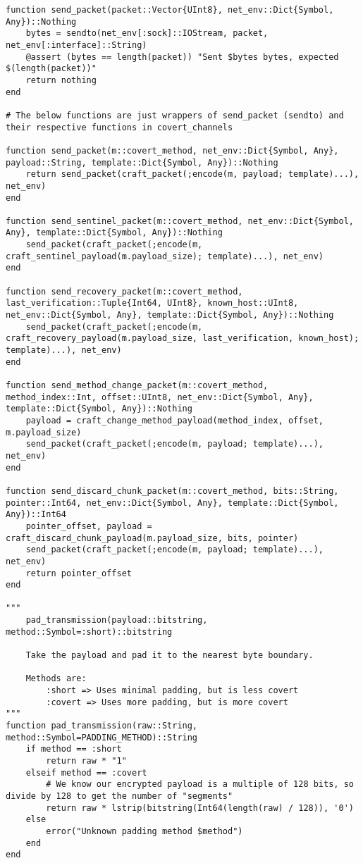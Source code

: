 \begin{lstlisting}[language=JuliaLocal, style=julia]
function send_packet(packet::Vector{UInt8}, net_env::Dict{Symbol, Any})::Nothing
    bytes = sendto(net_env[:sock]::IOStream, packet, net_env[:interface]::String)
    @assert (bytes == length(packet)) "Sent $bytes bytes, expected $(length(packet))"
    return nothing
end

# The below functions are just wrappers of send_packet (sendto) and their respective functions in covert_channels

function send_packet(m::covert_method, net_env::Dict{Symbol, Any}, payload::String, template::Dict{Symbol, Any})::Nothing
    return send_packet(craft_packet(;encode(m, payload; template)...), net_env)
end

function send_sentinel_packet(m::covert_method, net_env::Dict{Symbol, Any}, template::Dict{Symbol, Any})::Nothing
    send_packet(craft_packet(;encode(m, craft_sentinel_payload(m.payload_size); template)...), net_env)
end

function send_recovery_packet(m::covert_method, last_verification::Tuple{Int64, UInt8}, known_host::UInt8, net_env::Dict{Symbol, Any}, template::Dict{Symbol, Any})::Nothing
    send_packet(craft_packet(;encode(m, craft_recovery_payload(m.payload_size, last_verification, known_host); template)...), net_env)
end

function send_method_change_packet(m::covert_method, method_index::Int, offset::UInt8, net_env::Dict{Symbol, Any}, template::Dict{Symbol, Any})::Nothing
    payload = craft_change_method_payload(method_index, offset, m.payload_size)
    send_packet(craft_packet(;encode(m, payload; template)...), net_env)
end

function send_discard_chunk_packet(m::covert_method, bits::String, pointer::Int64, net_env::Dict{Symbol, Any}, template::Dict{Symbol, Any})::Int64
    pointer_offset, payload = craft_discard_chunk_payload(m.payload_size, bits, pointer)
    send_packet(craft_packet(;encode(m, payload; template)...), net_env)
    return pointer_offset
end

"""
    pad_transmission(payload::bitstring, method::Symbol=:short)::bitstring

    Take the payload and pad it to the nearest byte boundary.

    Methods are:
        :short => Uses minimal padding, but is less covert
        :covert => Uses more padding, but is more covert
"""
function pad_transmission(raw::String, method::Symbol=PADDING_METHOD)::String
    if method == :short
        return raw * "1"
    elseif method == :covert
        # We know our encrypted payload is a multiple of 128 bits, so divide by 128 to get the number of "segments"
        return raw * lstrip(bitstring(Int64(length(raw) / 128)), '0')
    else
        error("Unknown padding method $method")
    end
end


\end{lstlisting}

